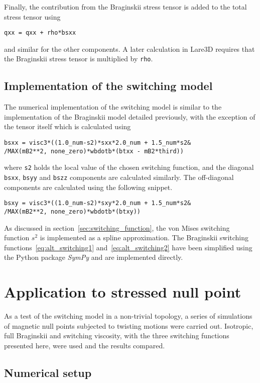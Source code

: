 Finally, the contribution from the Braginskii stress tensor is added to the total stress tensor using 
\begin{verbatim}
qxx = qxx + rho*bsxx
\end{verbatim}
and similar for the other components. A later calculation in Lare3D requires that the Braginskii stress tensor is multiplied by \verb|rho|.

\subsection{Implementation of the switching model}

The numerical implementation of the switching model is similar to the implementation of the Braginskii model detailed previously, with the exception of the tensor itself which is calculated using
\begin{verbatim}
bsxx = visc3*((1.0_num-s2)*sxx*2.0_num + 1.5_num*s2&
/MAX(mB2**2, none_zero)*wbdotb*(btxx - mB2*third))
\end{verbatim}
where \verb|s2| holds the local value of the chosen switching function, and the diagonal \verb|bsxx|, \verb|bsyy| and \verb|bszz| components are calculated similarly. The off-diagonal components are calculated using the following snippet.
\begin{verbatim}
bsxy = visc3*((1.0_num-s2)*sxy*2.0_num + 1.5_num*s2&
/MAX(mB2**2, none_zero)*wbdotb*(btxy))
\end{verbatim}

As discussed in section~\ref{sec:switching_function}, the von Mises switching function $s^2$ is implemented as a spline approximation. The Braginskii switching functions~\eqref{eq:alt_switching1} and~\eqref{eq:alt_switching2} have been simplified using the Python package \emph{SymPy} and are implemented directly. 

\section{Application to stressed null point}

\label{sec:slow_null_point}

As a test of the switching model in a non-trivial topology, a series of simulations of magnetic null points subjected to twisting motions were carried out. Isotropic, full Braginskii and switching viscosity, with the three switching functions presented here, were used and the results compared.

\subsection{Numerical setup}

